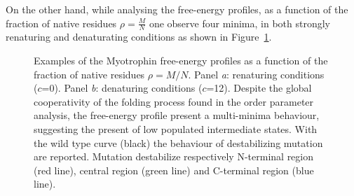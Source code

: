 On the other hand, while analysing the free-energy profiles, as a function of the fraction of native
residues $\rho=\frac MN$ one observe four minima, in both strongly renaturing and denaturating
conditions as shown in Figure~\ref{fig:eq}.
\begin{figure}
\centering
{}
\caption{Examples of the Myotrophin free-energy profiles as a function of
the fraction of native residues $ \rho = M/N$. Panel \emph{a}: renaturing conditions
($c$=0). Panel \emph{b}: denaturing conditions ($c$=12). Despite the global
cooperativity of the folding process found in the order parameter analysis, the
free-energy profile present a multi-minima behaviour, suggesting the present of
low populated intermediate states. With the wild type curve (black) the behaviour
of destabilizing mutation are reported. Mutation destabilize respectively
N-terminal region (red line), central region (green line) and C-terminal region
(blue line).}
\label{fig:eq}
\end{figure}

